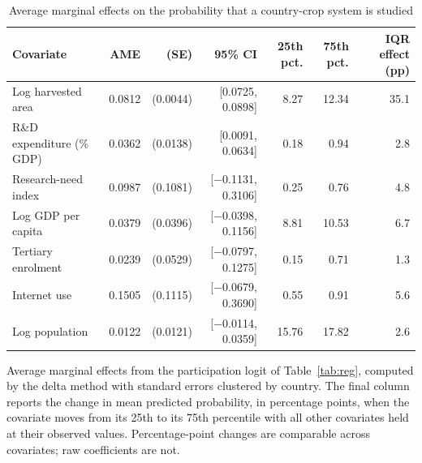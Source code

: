 \begin{table}[!t]
\centering
\footnotesize
\caption{Average marginal effects on the probability that a country-crop system is studied}
\label{tab:ame}
\begin{tabular*}{\textwidth}{@{\extracolsep\fill}l r r r r r r@{}}
\toprule
Covariate & AME & (SE) & 95\% CI & 25th pct. & 75th pct. & IQR effect (pp) \\
\midrule
Log harvested area & 0.0812 & (0.0044) & [0.0725, 0.0898] & 8.27 & 12.34 & 35.1 \\
R\&D expenditure (\% GDP) & 0.0362 & (0.0138) & [0.0091, 0.0634] & 0.18 & 0.94 & 2.8 \\
Research-need index & 0.0987 & (0.1081) & [$-$0.1131, 0.3106] & 0.25 & 0.76 & 4.8 \\
Log GDP per capita & 0.0379 & (0.0396) & [$-$0.0398, 0.1156] & 8.81 & 10.53 & 6.7 \\
Tertiary enrolment & 0.0239 & (0.0529) & [$-$0.0797, 0.1275] & 0.15 & 0.71 & 1.3 \\
Internet use & 0.1505 & (0.1115) & [$-$0.0679, 0.3690] & 0.55 & 0.91 & 5.6 \\
Log population & 0.0122 & (0.0121) & [$-$0.0114, 0.0359] & 15.76 & 17.82 & 2.6 \\
\bottomrule
\end{tabular*}
\begin{tablenotes}
\item[] Average marginal effects from the participation logit of Table~\ref{tab:reg}, computed by the delta method with standard errors clustered by country. The final column reports the change in mean predicted probability, in percentage points, when the covariate moves from its 25th to its 75th percentile with all other covariates held at their observed values. Percentage-point changes are comparable across covariates; raw coefficients are not.
\end{tablenotes}
\end{table}
